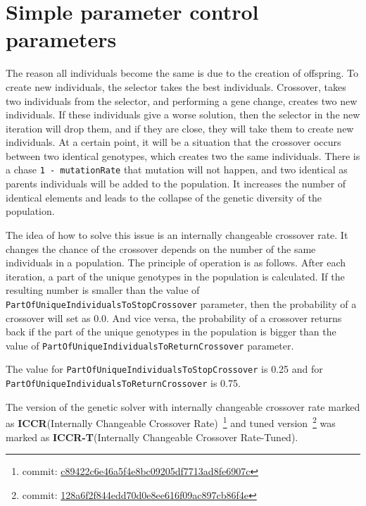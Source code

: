 \section{Simple parameter control parameters}

The reason all individuals become the same is due to the creation of offspring. To create new individuals, the selector takes the best individuals. Crossover, takes two individuals from the selector, and performing a gene change, creates two new individuals. If these individuals give a worse solution, then the selector in the new iteration will drop them, and if they are close, they will take them to create new individuals. At a certain point, it will be a situation that the crossover occurs between two identical genotypes, which creates two the same individuals. There is a chase \texttt{1~-~mutationRate} that mutation will not happen, and two identical as parents individuals will be added to the population. It increases the number of identical elements and leads to the collapse of the genetic diversity of the population.

The idea of how to solve this issue is an internally changeable crossover rate. It changes the chance of the crossover depends on the number of the same individuals in a population. 
The principle of operation is as follows. After each iteration, a part of the unique genotypes in the population is calculated. If the resulting number is smaller than the value of \texttt{PartOfUniqueIndividualsToStopCrossover} parameter, then the probability of a crossover will set as 0.0. And vice versa, the probability of a crossover returns back if the part of the unique genotypes in the population is bigger than the value of \texttt{PartOfUniqueIndividualsToReturnCrossover} parameter.

The value for \texttt{PartOfUniqueIndividualsToStopCrossover} is 0.25 and for \texttt{PartOfUniqueIndividualsToReturnCrossover} is 0.75.

The version of the genetic solver with internally changeable crossover rate marked as \textbf{ICCR}(Internally Changeable Crossover Rate)~\footnote{commit: \href{https://git-st.inf.tu-dresden.de/mquat/mquat2/commit/c89422c6e46a5f4e8bc09205df7713ad8fe6907c}{c89422c6e46a5f4e8bc09205df7713ad8fe6907c}} and tuned version~\footnote{commit: \href{https://git-st.inf.tu-dresden.de/mquat/mquat2/commit/128a6f2f844edd70d0e8ee616f09ac897cb86f4e}{128a6f2f844edd70d0e8ee616f09ac897cb86f4e}} was marked as \textbf{ICCR-T}(Internally Changeable Crossover Rate-Tuned).


